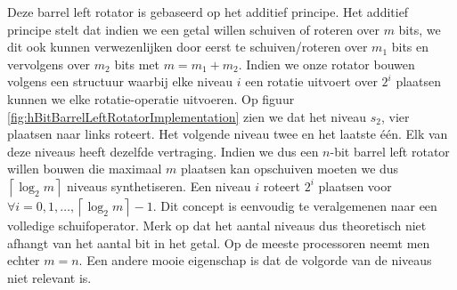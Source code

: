 Deze barrel left rotator is gebaseerd op het additief principe. Het additief principe stelt dat indien we een getal willen schuiven of roteren over $m$ bits, we dit ook kunnen verwezenlijken door eerst te schuiven/roteren over $m_1$ bits en vervolgens over $m_2$ bits met $m=m_1+m_2$. Indien we onze rotator bouwen volgens een structuur waarbij elke niveau $i$ een rotatie uitvoert over $2^i$ plaatsen kunnen we elke rotatie-operatie uitvoeren. Op figuur \ref{fig:hBitBarrelLeftRotatorImplementation} zien we dat het niveau $s_2$, vier plaatsen naar links roteert. Het volgende niveau twee en het laatste \'e\'en. Elk van deze niveaus heeft dezelfde vertraging. Indien we dus een $n$-bit barrel left rotator willen bouwen die maximaal $m$ plaatsen kan opschuiven moeten we dus $\left\lceil\log_2m\right\rceil$ niveaus synthetiseren. Een niveau $i$ roteert $2^i$ plaatsen voor $\forall i=0,1,\ldots,\left\lceil\log_2m\right\rceil-1$. Dit concept is eenvoudig te veralgemenen naar een volledige schuifoperator. Merk op dat het aantal niveaus dus theoretisch niet afhangt van het aantal bit in het getal. Op de meeste processoren neemt men echter $m=n$. Een andere mooie eigenschap is dat de volgorde van de niveaus niet relevant is.